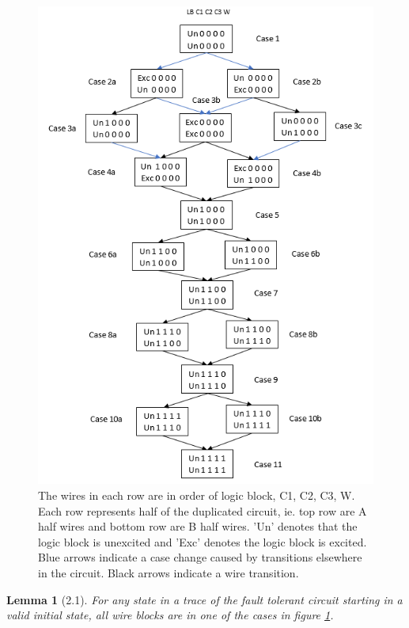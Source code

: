 \documentclass[12pt]{report}
\newtheorem*{lemma}{Lemma}
\begin{document}
\begin{figure}
  \centering
    \includegraphics{flowl2c3}
  \caption{The wires in each row are in order of logic block, C1, C2, C3, W.  Each row represents half of the duplicated circuit, ie. top row are A half wires and bottom row are B half wires.  'Un' denotes that the logic block is unexcited and 'Exc' denotes the logic block is excited.  Blue arrows indicate a case change caused by transitions elsewhere in the circuit.  Black arrows indicate a wire transition.}
  \label{fig:l21}
\end{figure}
\begin{lemma}[2.1]
For any state in a trace of the fault tolerant circuit starting in a valid initial state, all wire blocks are in one of the cases in figure \ref{fig:l21}.
\end{lemma}
\end{document}
